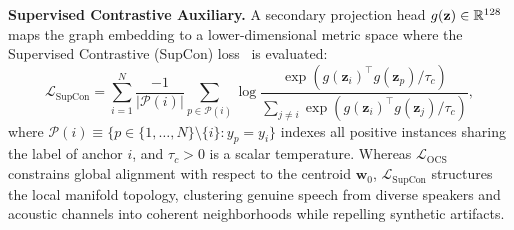 \noindent\textbf{Supervised Contrastive Auxiliary.} A secondary projection head $g(\mathbf{z}) \in \mathbb{R}^{128}$ maps the graph embedding to a lower-dimensional metric space where the Supervised Contrastive (SupCon) loss~\cite{khosla2020supcon} is evaluated:
\begin{equation}
\mathcal{L}_{\text{SupCon}} = \sum_{i=1}^N \frac{-1}{|\mathcal{P}(i)|}
    \sum_{p \in \mathcal{P}(i)} \log \frac{
        \exp(g(\mathbf{z}_i)^\top g(\mathbf{z}_p) / \tau_c)
    }{ \sum_{j \neq i} \exp(g(\mathbf{z}_i)^\top g(\mathbf{z}_j) / \tau_c) },
\label{eq:supcon}
\end{equation}
where $\mathcal{P}(i) \equiv \{ p \in \{1,\dots,N\} \setminus \{i\} : y_p = y_i \}$ indexes all positive instances sharing the label of anchor $i$, and $\tau_c > 0$ is a scalar temperature. Whereas $\mathcal{L}_{\text{OCS}}$ constrains global alignment with respect to the centroid $\mathbf{w}_0$, $\mathcal{L}_{\text{SupCon}}$ structures the local manifold topology, clustering genuine speech from diverse speakers and acoustic channels into coherent neighborhoods while repelling synthetic artifacts.

